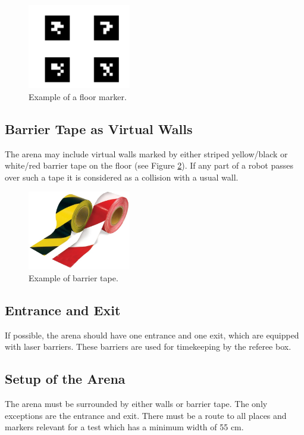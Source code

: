 \begin{figure}
\centering
\includegraphics[width= 0.4\textwidth ]{../images/example_floor_marker.png}
\caption{Example of a floor marker.}
\label{fig:floor_marker}
\end{figure}


\subsection{Barrier Tape as Virtual Walls}
The arena may include virtual walls marked by either striped yellow/black or white/red barrier tape on the floor (see Figure \ref{fig:barrier_tape}). If any part of a robot passes over such a tape it is considered as a collision with a usual wall.

\begin{figure}
\centering
\includegraphics[width= 0.4\textwidth ]{../images/example_barrier_tape.jpg}
\caption{Example of barrier tape.}
\label{fig:barrier_tape}
\end{figure}

\subsection{Entrance and Exit}
If possible, the arena should have one entrance and one exit, which are equipped with laser barriers. These barriers are used for timekeeping by the referee box.

\subsection{Setup of the Arena}
The arena must be surrounded by either walls or barrier tape. The only exceptions are the entrance and exit. There must be a route to all places and markers relevant for a test which has a minimum width of 55 cm.

